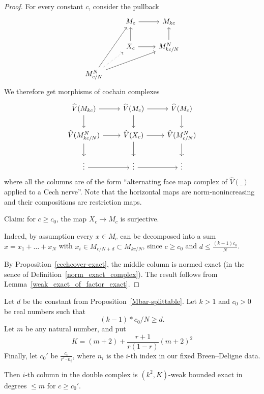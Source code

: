 \begin{proof}
  \leanok
  For every constant $c$,
  consider the pullback
  \[
    \begin{tikzcd}
      & M_c \rar & M_{kc} \\
      & X_c \uar \rar & M^N_{kc/N} \uar \\
      M^N_{c/N} \ar{uur} \ar{rru} \ar[dotted]{ur}
    \end{tikzcd}
  \]
  We therefore get morphisms of cochain complexes
  \[
    \begin{tikzcd}
      \hat V(M_{kc}) \rar\dar & \hat V(M_c) \rar\dar & \hat V(M_c) \dar \\
      \hat V(M^N_{kc/N}) \rar\dar & \hat V(X_c) \rar\dar & \hat V(M^N_{c/N}) \dar \\
      \vdots \rar & \vdots \rar & \vdots
    \end{tikzcd}
  \]
  where all the columns are of the form
  ``alternating face map complex of $\hat V(\_)$ applied to a Cech nerve''.
  Note that the horizontal maps are norm-nonincreasing
  and their compositions are restriction maps.

  Claim: for $c \ge c_0$, the map $X_c \to M_c$ is surjective.

  Indeed, by assumption every $x \in M_c$ can be decomposed into a sum
  $x = x_1 + \dots + x_N$ with $x_i \in M_{c/N+d} \subset M_{kc/N}$,
  since $c \ge c_0$ and $d \le \frac{(k-1)c_0}{N}$.

  By Proposition~\ref{cechcover-exact},
  the middle column is normed exact (in the sence of Definition~\ref{norm_exact_complex}).
  The result follows from Lemma~\ref{weak_exact_of_factor_exact}.
\end{proof}

\begin{proposition}
  \label{col_exact}
  \leanok
  Let $d$ be the constant from Proposition~\ref{Mbar-splittable}.
  Let $k > 1$ and $c_0 > 0$ be real numbers such that
  \[
    (k - 1) * c_0 / N \ge d.
  \]
  Let $m$ be any natural number, and put
  \[
    K = (m + 2) + \frac{r + 1}{r(1 - r)} (m + 2)^2
  \]
  Finally, let $c_0'$ be $\frac{c_0}{r' \cdot n_i}$,
  where $n_i$ is the $i$-th index in our fixed Breen--Deligne data.

  Then $i$-th column in the double complex
  is $(k^2, K)$-weak bounded exact in degrees $\le m$ for $c \ge c_0'$.
\end{proposition}

